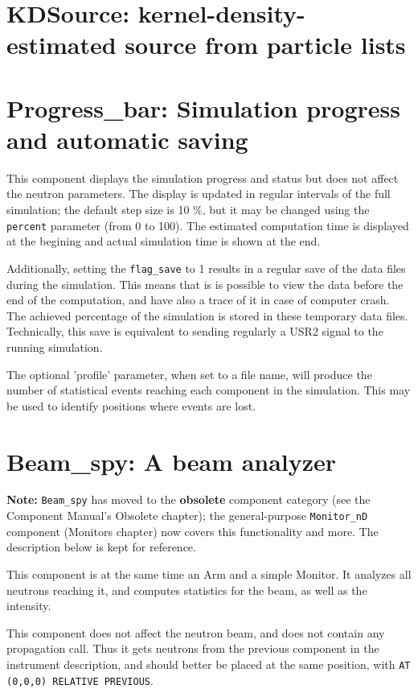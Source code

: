 



\newpage
\section{KDSource: kernel-density-estimated source from particle lists}
\label{s:kdsource}


\newpage
\section{Progress\_bar: Simulation progress and automatic saving}
\label{s:progress-bar}

This component displays the simulation progress and status
but does not affect the neutron parameters.
The display is updated in regular intervals of the full simulation;
the default step size is 10 \%, but it may be changed using
the \verb+percent+ parameter (from 0 to 100).
The estimated computation time is displayed at the begining
and actual simulation time is shown at the end.

Additionally, setting the \verb+flag_save+ to 1 results in
a regular save of the data files during the simulation.
This means that is is possible to view the data before the end
of the computation, and have also a trace of it in case of
computer crash. The achieved percentage of the simulation is stored in these temporary
data files. Technically, this save is equivalent to sending regularly
a USR2 signal to the running simulation.

The optional 'profile' parameter, when set to a file name, will produce the number of statistical events reaching each component in the simulation. This may be used to identify positions where events are lost.

\section{Beam\_spy: A beam analyzer}

\textbf{Note:} \texttt{Beam\_spy} has moved to the \textbf{obsolete} component
category (see the Component Manual's Obsolete chapter); the general-purpose
\texttt{Monitor\_nD} component (Monitors chapter) now covers this
functionality and more. The description below is kept for reference.

This component is at the same time an Arm and a simple Monitor. It analyzes all neutrons reaching it, and computes statistics for the beam, as well as the intensity.

This component does not affect the neutron beam, and does not contain any propagation call. Thus it gets neutrons from the previous component in the instrument description, and should better be placed at the same position, with \verb+AT (0,0,0) RELATIVE PREVIOUS+.
